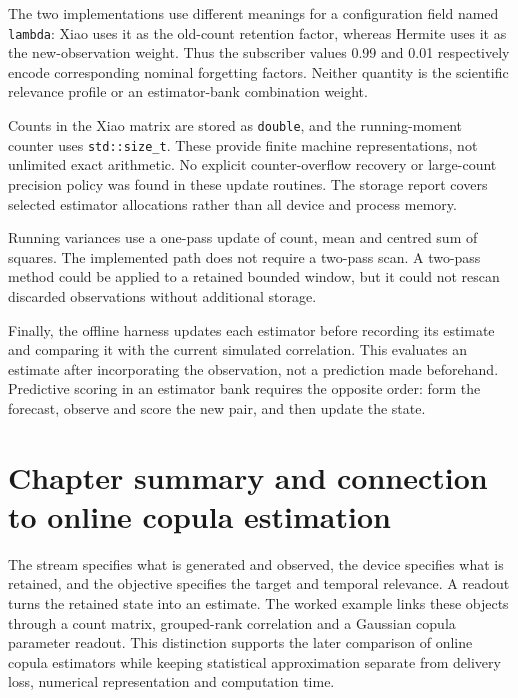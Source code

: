 The two implementations use different meanings for a configuration field named \texttt{lambda}: Xiao uses it as the old-count retention factor, whereas Hermite uses it as the new-observation weight. Thus the subscriber values 0.99 and 0.01 respectively encode corresponding nominal forgetting factors. Neither quantity is the scientific relevance profile or an estimator-bank combination weight.

Counts in the Xiao matrix are stored as \texttt{double}, and the running-moment counter uses \texttt{std::size\_t}. These provide finite machine representations, not unlimited exact arithmetic. No explicit counter-overflow recovery or large-count precision policy was found in these update routines. The storage report covers selected estimator allocations rather than all device and process memory.

Running variances use a one-pass update of count, mean and centred sum of squares. The implemented path does not require a two-pass scan. A two-pass method could be applied to a retained bounded window, but it could not rescan discarded observations without additional storage.

Finally, the offline harness updates each estimator before recording its estimate and comparing it with the current simulated correlation. This evaluates an estimate after incorporating the observation, not a prediction made beforehand. Predictive scoring in an estimator bank requires the opposite order: form the forecast, observe and score the new pair, and then update the state.

\section{Chapter summary and connection to online copula estimation}
The stream specifies what is generated and observed, the device specifies what is retained, and the objective specifies the target and temporal relevance. A readout turns the retained state into an estimate. The worked example links these objects through a count matrix, grouped-rank correlation and a Gaussian copula parameter readout. This distinction supports the later comparison of online copula estimators while keeping statistical approximation separate from delivery loss, numerical representation and computation time.
